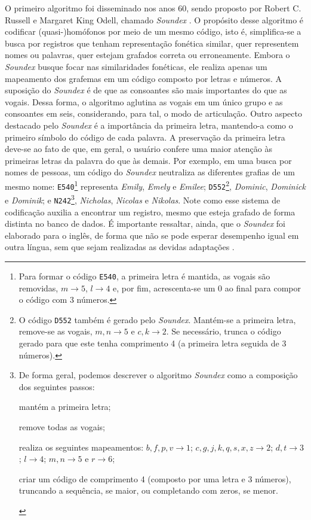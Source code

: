 \documentclass{textolivre}
\begin{document}
O primeiro algoritmo foi disseminado nos
anos 60, sendo proposto por Robert C. Russell e Margaret King Odell,
chamado \textit{Soundex} \cite{russell18,russell22,odell1956,knuth1973}.
O propósito desse algoritmo é
codificar (quasi-)homófonos por meio de um mesmo código, isto é, 
simplifica-se a busca por registros que tenham representação fonética similar, 
quer representem nomes ou palavras, quer estejam grafados correta ou erroneamente.
Embora o \textit{Soundex} busque focar nas similaridades fonéticas, ele realiza apenas um mapeamento
dos grafemas em um código composto por letras e números.
A suposição do \textit{Soundex} é de que as consoantes são mais importantes do que as vogais. Dessa forma, 
o algoritmo aglutina as vogais em um único grupo e as consoantes em seis,
considerando, para tal, o modo de articulação.
Outro aspecto destacado pelo \textit{Soundex} é a importância da primeira letra, mantendo-a como o 
primeiro símbolo do código de cada palavra.
A preservação da primeira letra deve-se
ao fato de que, em geral, o usuário
confere uma maior atenção às primeiras letras da palavra do que às demais.
Por exemplo, em uma busca por nomes de pessoas, um código do \textit{Soundex} neutraliza as diferentes grafias de um mesmo nome:
\texttt{E540}\footnote{Para formar o código \texttt{E540}, a primeira letra é mantida, as vogais são removidas, $m \rightarrow 5$, $l \rightarrow 4$ e, 
por fim, acrescenta-se um $0$ ao final para compor o código com 3 números.}
representa \textit{Emily}, \textit{Emely} e \textit{Emilee};
\texttt{D552}\footnote{O código \texttt{D552} também é gerado pelo \textit{Soundex}. Mantém-se a primeira letra, remove-se as vogais,
$m, n \rightarrow 5$ e $c,k \rightarrow 2$. Se necessário, trunca o código gerado para que este tenha comprimento 4 (a primeira letra seguida de 3 números).
}, \textit{Dominic}, \textit{Dominick} e \textit{Dominik}; e
\texttt{N242}\footnote{De forma geral, podemos descrever o algoritmo \textit{Soundex} como  
a composição dos seguintes passos: 
\begin{enumerate*}[label={\roman*)}]
\item mantém a primeira letra;
\item remove todas as vogais;
\item realiza os seguintes mapeamentos: $b, f, p, v \rightarrow 1$; 
$c, g, j, k, q, s, x, z \rightarrow 2$; $d, t \rightarrow 3$; $l \rightarrow 4$; $m, n \rightarrow 5$ e $r \rightarrow 6$;
\item criar um código de comprimento 4 (composto por uma letra e 3 números), truncando a sequência, se maior, ou completando com zeros, se menor.
\end{enumerate*}
}, 
\textit{Nicholas}, \textit{Nicolas} e \textit{Nikolas}.
Note como esse sistema de codificação auxilia a encontrar um registro, mesmo que 
esteja grafado de forma distinta no banco de dados.
É importante ressaltar, ainda, que o \textit{Soundex} foi elaborado para o inglês, 
de forma que não se pode esperar desempenho igual em outra língua,
sem que sejam realizadas as devidas adaptações \cite{beider2008,beider2010,angeles2015}. 
\end{document}
